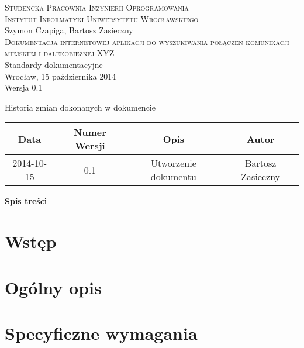 \documentclass[12pt,a4paper]{report}
\makeatletter
\newcommand*{\toccontents}{\@starttoc{toc}}
\makeatother
\begin{document}
\newcommand{\itab}[1]{\hspace{4em}\rlap{#1}}
\newcommand{\tab}[1]{\hspace{.2\textwidth}\rlap{#1}}

\begin{titlepage}
\begin{center}
\textsc{Studencka Pracownia Inżynierii Oprogramowania}\\[0.5cm]
\textsc{Instytut Informatyki Uniwersytetu Wrocławskiego}\\[8.3cm]

Szymon Czapiga, Bartosz Zasieczny\\[1.0cm]

\textsc{\LARGE{Dokumentacja internetowej aplikacji do wyszukiwania połączen komunikacji miejskiej i dalekobieżnej XYZ}}\\[1.0cm]

Standardy dokumentacyjne\\[8.3cm]

Wrocław, 15 października 2014\\[0.5cm]
Wersja 0.1
\end{center}
\end{titlepage}

\begin{table}[h1]
 \itab \textit{Tabela 0.} Historia zmian dokonanych w dokumencie
  \begin{center}
    \begin{tabular}{| c | c | c | c |}
    \hline
    Data & Numer Wersji & Opis & Autor \\
    \hline \hline
    2014-10-15 & 0.1 & Utworzenie dokumentu & Bartosz Zasieczny \\
    \hline
    \end{tabular}
  \end{center}
\end{table}
\textbf{\large{Spis treści}}\\[0.3cm]
\toccontents
\newpage
\section{Wstęp}
\section{Ogólny opis}
\section{Specyficzne wymagania}
\end{document}
